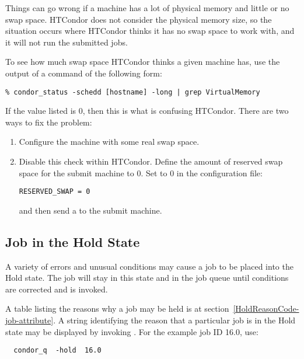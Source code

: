 Things can go wrong if a machine has a lot of physical memory and
little or no swap space.
HTCondor does not consider the physical memory size,
so the situation occurs where HTCondor thinks
it has no swap space to work with,
and it will not run the submitted jobs.

To see how much swap space HTCondor thinks a given machine has, use
the output of a  command of the following form:

\footnotesize
\begin{verbatim}
% condor_status -schedd [hostname] -long | grep VirtualMemory
\end{verbatim}
\normalsize
If the value listed is 0, then this is what is confusing HTCondor.
There are two ways to fix the problem:

\begin{enumerate}
\item Configure the machine with some real swap space.

\item Disable this check within HTCondor.
Define the amount of reserved swap space for the submit machine to 0.
Set  to 0 in the configuration file:

\begin{verbatim}
RESERVED_SWAP = 0
\end{verbatim}

and then send a  to the submit machine.
\end{enumerate}

\subsection{\label{sec:job-on-hold}Job in the Hold State}
A variety of errors and unusual conditions may cause a job to be placed
into the Hold state.
The job will stay in this state and in the job queue until
conditions are corrected and  is invoked.

A table listing the reasons why a job may be held is at
section~\ref{HoldReasonCode-job-attribute}.
A string identifying the reason that a particular job is in the 
Hold state may be displayed by invoking .
For the example job ID 16.0, use:
\begin{verbatim} 
  condor_q  -hold  16.0
\end{verbatim} 

